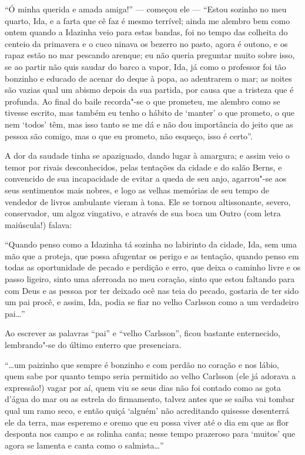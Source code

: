 ``Ó minha querida e amada amiga!'' --- começou ele --- ``Estou sozinho no meu
quarto, Ida, e a farta que cê faz é mesmo terrível; ainda me alembro bem como
ontem quando a Idazinha veio para estas bandas, foi no tempo das colheita do
centeio da primavera e o cuco ninava os bezerro no pasto, agora é outono, e os
rapaz estão no mar pescando arenque; eu não queria preguntar muito sobre isso,
se ao partir não quis saudar do barco a vapor, Ida, já como o professor foi tão
bonzinho e educado de acenar do deque à popa, ao adentrarem o mar; as noites são
vazias qual um abismo depois da sua partida, por causa que a tristeza que é
profunda. Ao final do baile recorda"-se o que prometeu, me alembro como se
tivesse escrito, mas também eu tenho o hábito de `manter' o que prometo, o que
nem `todos' têm, mas isso tanto se me dá e não dou importância do jeito que as
pessoa são comigo, mas o que eu prometo, não esqueço, isso é certo''.

A dor da saudade tinha se apaziguado, dando lugar à amargura; e assim veio
o temor por rivais desconhecidos, pelas tentações da cidade e do salão Berns,
e convencido de sua incapacidade de evitar a queda de seu anjo, agarrou"-se aos
seus sentimentos mais nobres, e logo as velhas memórias de seu tempo de vendedor
de livros ambulante vieram à tona. Ele se tornou altissonante, severo,
conservador, um algoz vingativo, e através de sua boca um Outro (com letra
maiúscula!) falava:

``Quando penso como a Idazinha tá sozinha no labirinto da cidade, Ida, sem
uma mão que a proteja, que possa afugentar os perigo e as tentação, quando penso
em todas as oportunidade de pecado e perdição e erro, que deixa o caminho livre
e os passo ligeiro, sinto uma aferroada no meu coração, sinto que estou
faltando para com Deus e as pessoa por ter deixado ocê nas teia do
pecado, gostaria de ter sido um pai procê, e assim, Ida, podia se fiar no velho
Carlsson como a um verdadeiro pai\ldots{}''

Ao escrever as palavras ``pai'' e ``velho Carlsson'', ficou bastante
enternecido, lembrando"-se do último enterro que presenciara.

``\ldots{}um paizinho que sempre é bonzinho e com perdão no coração e nos lábio,
quem sabe por quanto tempo seria permitido ao velho Carlsson (ele já adorava a
expressão!) vagar por aí, quem viu se seus dias não foi contado como as gota
d’água do mar ou as estrela do firmamento, talvez antes que se saiba vai tombar
qual um ramo seco, e então quiçá `alguém' não acreditando quisesse desenterrá
ele da terra, mas esperemo e oremo que eu possa viver até o dia em que as flor
desponta nos campo e as rolinha canta; nesse tempo prazeroso para `muitos' que
agora se lamenta e canta como o salmista\ldots{}''

